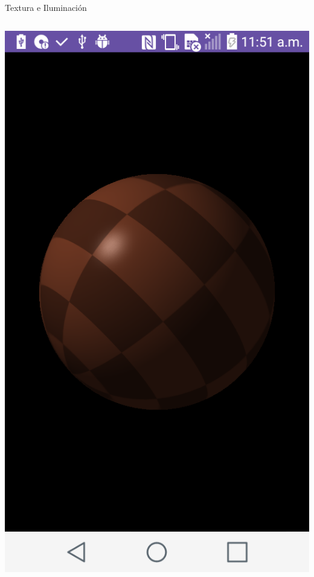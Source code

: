 \documentclass[aspectratio=169,compress]{beamer}
\begin{document}
\begin{frame}{Textura e Iluminación}
\begin{columns}
\begin{column}{0.3\textwidth}
\begin{center}
\includegraphics[width=1.0\linewidth]{PantallazosDemoTaller/Demo13.png}
\end{center}
\end{column}
\end{columns}
\end{frame}
\end{document}
